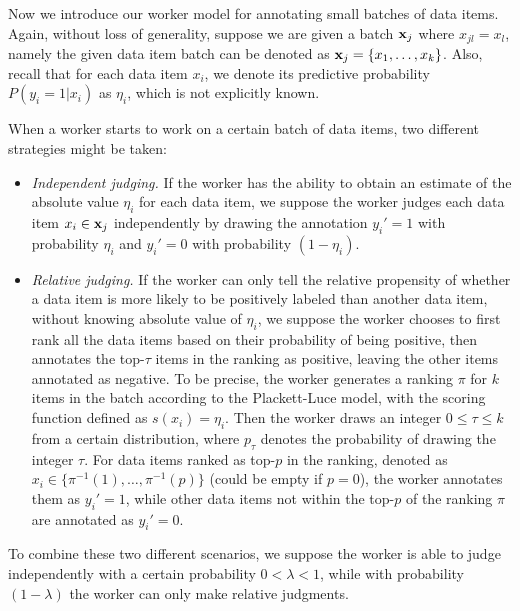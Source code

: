 %

Now we introduce our worker model for annotating small batches of data items.
Again, without loss of generality, suppose we are given a batch ${\mathbf{x}}_j$ where $x_{jl} = x_l$, 
namely the given data item batch can be denoted as ${\mathbf{x}}_j=\{x_1, \ldots, x_k\}$.  
Also, recall that for each data item $x_i$, we denote its predictive probability $P(y_i = 1 | x_i)$ as $\eta_i$, 
which is not explicitly known.  

When a worker starts to work on a certain batch of data items, 
two different strategies might be taken:
\begin{itemize}
  \item \emph{Independent judging.}  
  If the worker has the ability to obtain an estimate of the absolute value $\eta_i$ for each data item, 
  we suppose the worker judges each data item $x_i \in {\mathbf{x}}_j$ independently 
  by drawing the annotation $y_i'=1$ with probability $\eta_i$ and $y_i' = 0$ with probability $(1 - \eta_i)$.  
  \item \emph{Relative judging.}
  If the worker can only tell the relative propensity of whether a data item is more likely to be positively labeled than another data item, 
  without knowing absolute value of $\eta_i$, 
  we suppose the worker chooses to first rank all the data items based on their probability of being positive,
  then annotates the top-$\tau$ items in the ranking as positive, leaving the other items annotated as negative.
  To be precise, the worker generates a ranking $\pi$ for $k$ items in the batch according to the Plackett-Luce model,
  with the scoring function defined as $s(x_i) = \eta_i$.
  Then the worker draws an integer $0 \leq \tau \leq k$ from a certain distribution,
  where $p_\tau$ denotes the probability of drawing the integer $\tau$.
  For data items ranked as top-$p$ in the ranking, 
  denoted as $x_i \in \{\pi^{-1}(1), \ldots, \pi^{-1}(p)\}$ (could be empty if $p = 0$), 
  the worker annotates them as $y_i'=1$,
  while other data items not within the top-$p$ of the ranking $\pi$ are annotated as $y_i' = 0$.
\end{itemize}
To combine these two different scenarios, 
we suppose the worker is able to judge independently with a certain probability $0 < \lambda < 1$, 
while with probability $(1-\lambda)$ the worker can only make relative judgments.  

